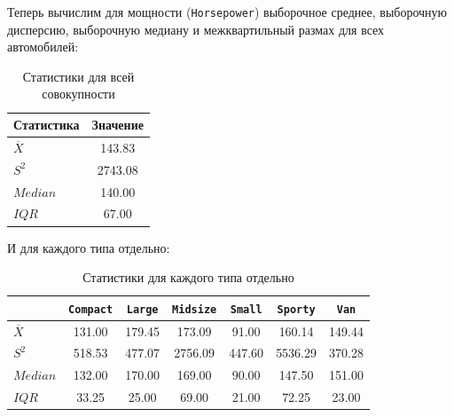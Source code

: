 \documentclass[a4paper,12pt]{article}
\begin{document}
Теперь вычислим для мощности (\texttt{Horsepower}) выборочное среднее, выборочную дисперсию, выборочную медиану и межквартильный размах для всех автомобилей: 
\begin{table}[H]
    \centering
    \begin{tabular}{|l|c|}
        \hline
        \textbf{Статистика} & \textbf{Значение}  \\ 
        \hline
        $\overline{X}$  & 143.83 \\
        $S^2$ & 2743.08 \\
        $Median$ & 140.00 \\
        $IQR$ & 67.00 \\
        \hline
    \end{tabular} 
    \caption{Статистики для всей совокупности}
\end{table}
И для каждого типа отдельно:
\begin{table}[H]
    \centering
        \begin{tabular}{|l|c|c|c|c|c|c|}
        \hline
            & \texttt{Compact} & \texttt{Large} & \texttt{Midsize} & \texttt{Small} & \texttt{Sporty} & \texttt{Van} \\
        \hline
        $\overline{X}$ & 131.00 & 179.45 & 173.09 & 91.00 & 160.14 & 149.44 \\
        $S^2$          & 518.53 & 477.07 & 2756.09 & 447.60 & 5536.29 & 370.28 \\
        $Median$       & 132.00 & 170.00 & 169.00  & 90.00  & 147.50  & 151.00 \\
        $IQR$          & 33.25  & 25.00  & 69.00   & 21.00  & 72.25   & 23.00  \\
        \hline
        \end{tabular}
    \caption{Статистики для каждого типа отдельно}
\end{table}
\end{document}
